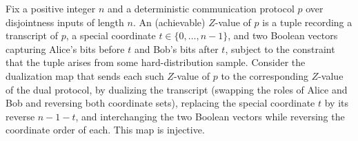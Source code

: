 \begin{theorem}
\label{CommunicationComplexity.Functions.Disjointness.RandomizedLowerBound.dualZValue_injective}
\leanok
{}
Fix a positive integer $n$ and a deterministic communication protocol $p$ over
disjointness inputs of length $n$. An (achievable) $Z$-value of $p$ is a tuple recording
a transcript of $p$, a special coordinate $t \in \{0,\dots,n-1\}$, and two Boolean
vectors capturing Alice's bits before $t$ and Bob's bits after $t$, subject to the
constraint that the tuple arises from some hard-distribution sample. Consider the
dualization map that sends each such $Z$-value of $p$ to the corresponding $Z$-value of
the dual protocol, by dualizing the transcript (swapping the roles of Alice and Bob and
reversing both coordinate sets), replacing the special coordinate $t$ by its reverse
$n-1-t$, and interchanging the two Boolean vectors while reversing the coordinate order
of each. This map is injective.
\end{theorem}

